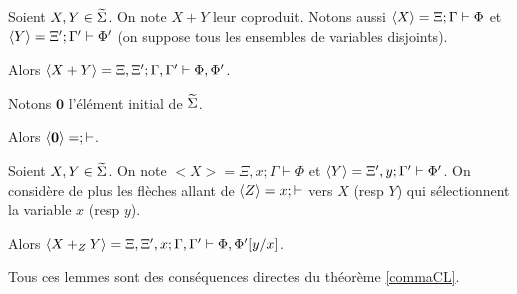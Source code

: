 \begin{lem}
    Soient $X,Y\in\widetilde{\Sigma}$. On note $X+Y$ leur coproduit. Notons aussi
    $\langle{X}\rangle = \Xi;\Gamma\vdash\Phi$ et $\langle{Y}\rangle = \Xi';\Gamma'\vdash\Phi'$ (on suppose
    tous les ensembles de variables disjoints).
    
    Alors $\langle{X+Y}\rangle = \Xi,\Xi';\Gamma,\Gamma'\vdash\Phi,\Phi'$.
\end{lem}

\begin{lem}
    Notons $\mathbf{0}$ l'élément initial de $\widetilde{\Sigma}$.
    
    Alors $\langle{\mathbf{0}}\rangle = ;\vdash$.
\end{lem}

\begin{lem}
    Soient $X,Y\in\widetilde{\Sigma}$. On note $<X> = \Xi,x;\Gamma\vdash\Phi$ et
    $\langle{Y}\rangle = \Xi',y;\Gamma'\vdash\Phi'$. On considère de plus les flèches allant de
    $\langle{Z}\rangle = x;\vdash$ vers $X$ (resp $Y$) qui sélectionnent la variable $x$ (resp $y$).

    Alors $\langle{X +_Z Y}\rangle = \Xi,\Xi',x;\Gamma,\Gamma'\vdash\Phi,\Phi'[y/x]$.
\end{lem}

\begin{pv}
    Tous ces lemmes sont des conséquences directes du théorème \ref{commaCL}.
\end{pv}


